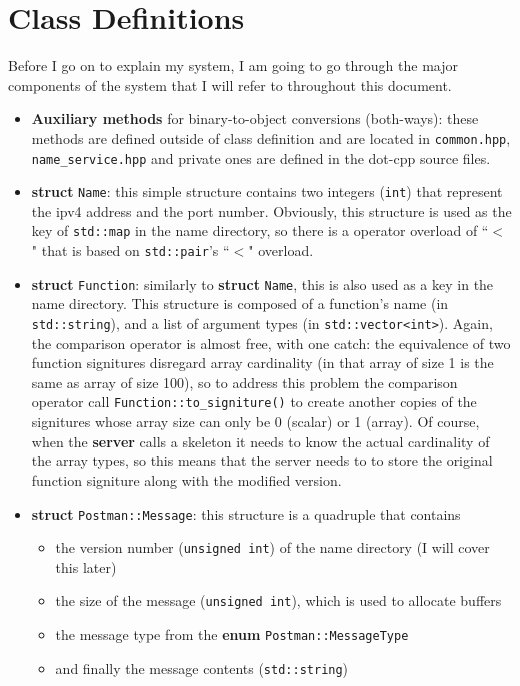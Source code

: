 \section{Class Definitions}
Before I go on to explain my system, I am going to go through the major components of the system that I will refer to throughout this document.

\begin{itemize}
\item
{\bf Auxiliary methods} for binary-to-object conversions (both-ways): these methods are defined outside of class definition and are located in {\tt common.hpp}, {\tt name\_service.hpp} and private ones are defined in the dot-cpp source files.
\item
{\bf struct} {\tt Name}: this simple structure contains two integers ({\tt int}) that represent the ipv4 address and the port number.
Obviously, this structure is used as the key of {\tt std::map} in the name directory, so there is a operator overload of ``$<$" that is based on {\tt std::pair}'s ``$<$" overload.

\item
{\bf struct} {\tt Function}: similarly to {\bf struct} {\tt Name}, this is also used as a key in the name directory.
This structure is composed of a function's name (in {\tt std::string}), and a list of argument types (in {\tt std::vector<int>}).
Again, the comparison operator is almost free, with one catch: the equivalence of two function signitures disregard array cardinality (in that array of size 1 is the same as array of size 100), so to address this problem the comparison operator call {\tt Function::to\_signiture()} to create another copies of the signitures whose array size can only be 0 (scalar) or 1 (array).
Of course, when the {\bf server} calls a skeleton it needs to know the actual cardinality of the array types, so this means that the server needs to to store the original function signiture along with the modified version.

\item
{\bf struct} {\tt Postman::Message}: this structure is a quadruple that contains
\begin{itemize}
\item
the version number ({\tt unsigned int}) of the name directory (I will cover this later)
\item
the size of the message ({\tt unsigned int}), which is used to allocate buffers
\item
the message type from the {\bf enum} {\tt Postman::MessageType}
\item
and finally the message contents ({\tt std::string})
\end{itemize}


\end{itemize}
